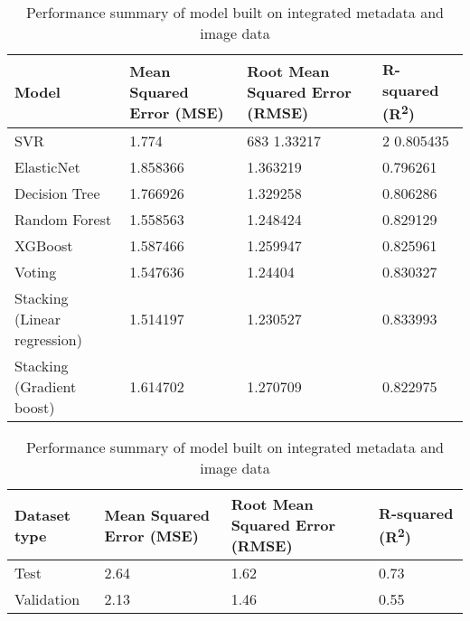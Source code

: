 \pagebreak
\begin{longtable}{| p{} | p{} | p{} | p{} |}
    \caption{Performance summary of model built on integrated metadata and image data}
    \label{tab:pca_models} \\
    \hline
    \textbf{Model} &
    \textbf{Mean Squared Error \newline(MSE)} &
    \textbf{Root Mean Squared Error \newline (RMSE)} &
    \textbf{R-squared (R\textsuperscript{2})} \\
    \hline
    \hline
    SVR &
    1.774 & 683
    1.33217 & 2
    0.805435 \\
    \hline
    ElasticNet &
    1.858366 &
    1.363219 &
    0.796261 \\
    \hline
    Decision Tree &
    1.766926 &
    1.329258 &
    0.806286 \\
    \hline
    Random Forest &
    1.558563 &
    1.248424 &
    0.829129 \\
    \hline
    XGBoost &
    1.587466 &
    1.259947 &
    0.825961 \\
    \hline
    Voting &
    1.547636 &
    1.24404 &
    0.830327 \\
    \hline
    Stacking \newline(Linear regression) &
    1.514197 &
    1.230527 &
    0.833993 \\
    \hline
    Stacking \newline(Gradient boost) &
    1.614702 &
    1.270709 &
    0.822975 \\
    \hline
\end{longtable}


\pagebreak
\begin{longtable}{| p{} | p{} | p{} | p{} |}
    \caption{Performance summary of model built on integrated metadata and image data}
    \label{tab:cnn_models} \\
    \hline
    \textbf{Dataset type} &
    \textbf{Mean Squared Error \newline(MSE)} &
    \textbf{Root Mean Squared Error \newline (RMSE)} &
    \textbf{R-squared (R\textsuperscript{2})} \\
    \hline
    \hline
    Test &
    2.64 &
    1.62 &
    0.73 \\
    \hline
    Validation &
    2.13 &
    1.46 &
    0.55 \\
    \hline
\end{longtable}

